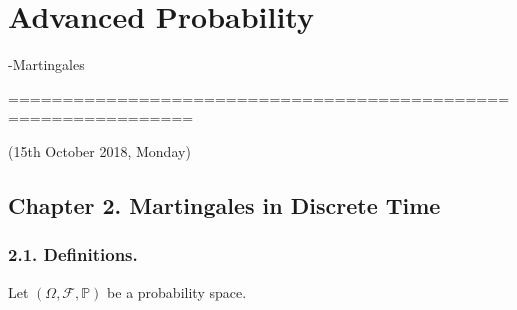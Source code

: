 \documentclass[10pt,a4paper]{report}
\begin{document}
\newcommand{\thm}{\textbf{Theorem) }}
\newcommand{\thmnum}[1]{\textbf{Theorem #1) }}
\newcommand{\defi}{\textbf{Definition) }}
\newcommand{\definum}[1]{\textbf{Definition #1) }}
\newcommand{\lem}{\textbf{Lemma) }}
\newcommand{\lemnum}[1]{\textbf{Lemma #1) }}
\newcommand{\prop}{\textbf{Proposition)}}
\newcommand{\propnum}[1]{\textbf{Proposition #1) }}
\newcommand{\corr}{\textbf{Corollary) }}
\newcommand{\corrnum}[1]{\textbf{Corollary #1) }}
\newcommand{\pf}{\textbf{proof) }}


\newcommand{\lap}{\triangle} %
\newcommand{\s}{\vspace{10pt}}
\newcommand{\bull}{$\bullet$}
\newcommand{\sta}{$\star$}
\newcommand{\reals}{\mathbb{R}}

\newcommand{\eop}{\hfill  \textsl{(End of proof)} $\square$} %
\newcommand{\eos}{\hfill  \textsl{(End of statement)} $\square$} %


\newcommand{\intN}{\mathbb{Z}_N}
\newcommand{\nat}{\mathbb{N}}
\newcommand{\norms}[2]{\parallel #1 \parallel_{#2}}
\newcommand{\avg}{\mathbb{E}}
\newcommand{\prob}{\mathbb{P}}
\newcommand{\borel}{\mathscr{B}}
\newcommand{\EE}{\mathscr{E}}
\newcommand{\cov}{\text{Cov}}
\newcommand{\var}{\text{Var}}

\newcommand{\newday}{===============================================================}

\setlength\parindent{0pt}

\chapter*{Advanced Probability}
\s

\begin{large}
-Martingales
\end{large}

\newday

(15th October 2018, Monday)
\s

\section*{Chapter 2. Martingales in Discrete Time}

\subsection*{2.1. Definitions.}

\newcommand{\F}{\mathscr{F}}
\newcommand{\G}{\mathscr{G}}

Let $(\Omega, \F, \prob)$ be a probability space.
\end{document}
